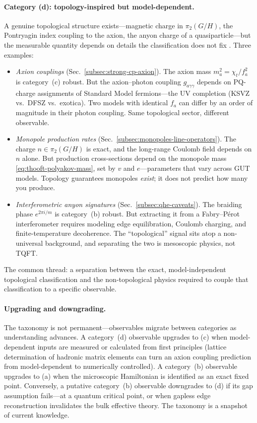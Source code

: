 \paragraph{Category (d): topology-inspired but model-dependent.}
A genuine topological structure exists---magnetic charge in $\pi_2(G/H)$, the Pontryagin index coupling to the axion, the anyon charge of a quasiparticle---but the measurable quantity depends on details the classification does not fix \cite{Witten2016ThreeLecturesTopologicalPhases}. Three examples:
\begin{itemize}
  \item \textit{Axion couplings} (Sec.~\ref{subsec:strong-cp-axion}). The axion mass $m_a^2 = \chi_t/f_a^2$ is category~(c) robust. But the axion--photon coupling $g_{a\gamma\gamma}$ depends on PQ-charge assignments of Standard Model fermions---the UV completion (KSVZ vs.\ DFSZ vs.\ exotica). Two models with identical $f_a$ can differ by an order of magnitude in their photon coupling. Same topological sector, different observable.

  \item \textit{Monopole production rates} (Sec.~\ref{subsec:monopoles-line-operators}). The charge $n\in\pi_2(G/H)$ is exact, and the long-range Coulomb field depends on $n$ alone. But production cross-sections depend on the monopole mass \eqref{eq:thooft-polyakov-mass}, set by $v$ and $e$---parameters that vary across GUT models. Topology guarantees monopoles \emph{exist}; it does not predict how many you produce.

  \item \textit{Interferometric anyon signatures} (Sec.~\ref{subsec:qhe-caveats}). The braiding phase $e^{2\pi i/m}$ is category~(b) robust. But extracting it from a Fabry--P\'erot interferometer requires modeling edge equilibration, Coulomb charging, and finite-temperature decoherence. The ``topological'' signal sits atop a non-universal background, and separating the two is mesoscopic physics, not TQFT.
\end{itemize}
The common thread: a separation between the exact, model-independent topological classification and the non-topological physics required to couple that classification to a specific observable.

\paragraph{Upgrading and downgrading.}
The taxonomy is not permanent---observables migrate between categories as understanding advances. A category~(d) observable upgrades to (c) when model-dependent inputs are measured or calculated from first principles (lattice determination of hadronic matrix elements can turn an axion coupling prediction from model-dependent to numerically controlled). A category~(b) observable upgrades to (a) when the microscopic Hamiltonian is identified as an exact fixed point. Conversely, a putative category~(b) observable downgrades to (d) if its gap assumption fails---at a quantum critical point, or when gapless edge reconstruction invalidates the bulk effective theory. The taxonomy is a snapshot of current knowledge.

